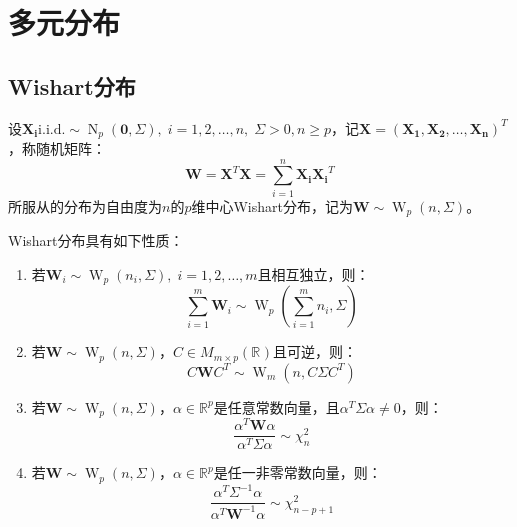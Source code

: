 \section{多元分布}

\subsection{Wishart分布}
\begin{definition}
	设$\mathbf{X_i}\text{i.i.d.}\sim\operatorname{N}_p(\mathbf{0},\Sigma),\;i=1,2,\dots,n,\;\Sigma>0,n\geqslant p$，记$\mathbf{X}=(\mathbf{X_1},\mathbf{X_2},\dots,\mathbf{X_n})^T$，称随机矩阵：
	\begin{equation*}
		\mathbf{W}=\mathbf{X}^T\mathbf{X}=\sum_{i=1}^{n}\mathbf{X_i}\mathbf{X_i}^T
	\end{equation*}
	所服从的分布为自由度为$n$的$p$维中心Wishart分布，记为$\mathbf{W}\sim\operatorname{W}_p(n,\Sigma)$。
\end{definition}
\begin{property}\label{prop:Wishart}
	Wishart分布具有如下性质：
	\begin{enumerate}
		\item 若$\mathbf{W}_i\sim\operatorname{W}_p(n_i,\Sigma),\;i=1,2,\dots,m$且相互独立，则：
		\begin{equation*}
			\sum_{i=1}^{m}\mathbf{W}_i\sim\operatorname{W}_p\left(\sum_{i=1}^{m}n_i,\Sigma\right)
		\end{equation*}
		\item 若$\mathbf{W}\sim\operatorname{W}_p(n,\Sigma)$，$C\in M_{m\times p}(\mathbb{R}^{})$且可逆，则：
		\begin{equation*}
			C\mathbf{W}C^T\sim\operatorname{W}_m(n, C\Sigma C^T)
		\end{equation*}
		\item 若$\mathbf{W}\sim\operatorname{W}_p(n,\Sigma)$，$\alpha\in\mathbb{R}^{p}$是任意常数向量，且$\alpha^T\Sigma\alpha\ne0$，则：
		\begin{equation*}
			\frac{\alpha^T\mathbf{W}\alpha}{\alpha^T\Sigma\alpha}\sim\chi_n^2
		\end{equation*}
		\item 若$\mathbf{W}\sim\operatorname{W}_p(n,\Sigma)$，$\alpha\in\mathbb{R}^{p}$是任一非零常数向量，则：
		\begin{equation*}
			\frac{\alpha^T\Sigma^{-1}\alpha}{\alpha^T\mathbf{W}^{-1}\alpha}\sim\chi_{n-p+1}^2
		\end{equation*}
	\end{enumerate}
\end{property}
